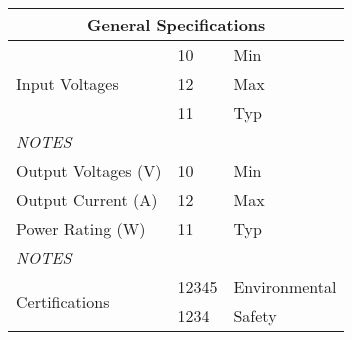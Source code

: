 \begin{tabular}{@{}p{6cm}p{4cm}p{5cm}@{}}
\toprule
\multicolumn{3}{c}{\textbf{General Specifications}} \\
\midrule
\multirow{3}{=}{Input Voltages} & 10 & Min \\
                                & 12 & Max \\
                                & 11 & Typ \\
\multicolumn{3}{l}{\textit{NOTES}} \\
\midrule
Output Voltages (V) & 10 & Min \\
Output Current (A) & 12 & Max \\
Power Rating (W) & 11 & Typ \\
\multicolumn{3}{l}{\textit{NOTES}} \\
\midrule
\multirow{2}{=}{Certifications} & 12345 & Environmental \\
                                & 1234  & Safety \\
\end{tabular}
